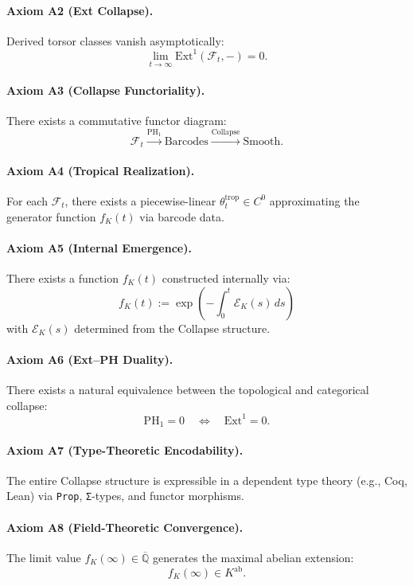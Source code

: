 \documentclass[11pt]{article}
\begin{document}
\paragraph{Axiom A2 (Ext Collapse).}  
Derived torsor classes vanish asymptotically:
\[
\lim_{t \to \infty} \mathrm{Ext}^1(\mathcal{F}_t, -) = 0.
\]

\paragraph{Axiom A3 (Collapse Functoriality).}  
There exists a commutative functor diagram:
\[
\mathcal{F}_t \xrightarrow{\mathrm{PH}_1} \text{Barcodes} \xrightarrow{\text{Collapse}} \text{Smooth}.
\]

\paragraph{Axiom A4 (Tropical Realization).}  
For each \( \mathcal{F}_t \), there exists a piecewise-linear \( \theta_t^{\mathrm{trop}} \in C^0 \)  
approximating the generator function \( f_K(t) \) via barcode data.

\paragraph{Axiom A5 (Internal Emergence).}  
There exists a function \( f_K(t) \) constructed internally via:
\[
f_K(t) := \exp\left( - \int_0^t \mathcal{E}_K(s)\, ds \right)
\]
with \( \mathcal{E}_K(s) \) determined from the Collapse structure.

\paragraph{Axiom A6 (Ext–PH Duality).}  
There exists a natural equivalence between the topological and categorical collapse:
\[
\mathrm{PH}_1 = 0 \quad \Longleftrightarrow \quad \mathrm{Ext}^1 = 0.
\]

\paragraph{Axiom A7 (Type-Theoretic Encodability).}  
The entire Collapse structure is expressible in a dependent type theory  
(e.g., Coq, Lean) via \texttt{Prop}, \texttt{Σ}-types, and functor morphisms.

\paragraph{Axiom A8 (Field-Theoretic Convergence).}  
The limit value \( f_K(\infty) \in \overline{\mathbb{Q}} \) generates the maximal abelian extension:
\[
f_K(\infty) \in K^{\mathrm{ab}}.
\]
\end{document}
